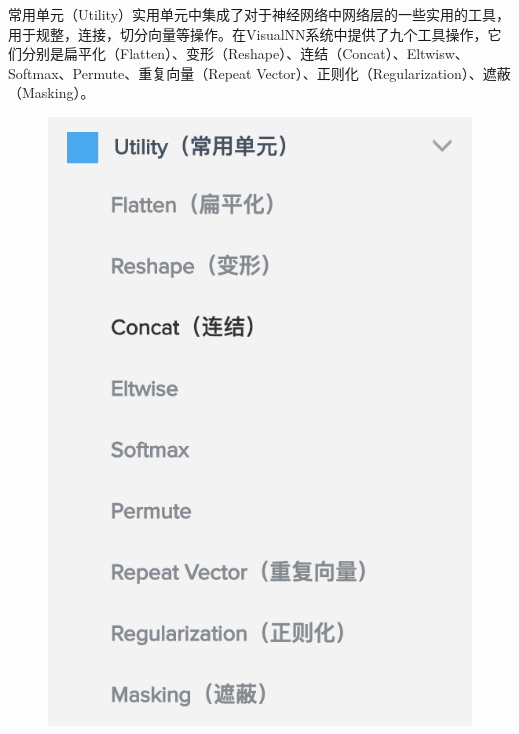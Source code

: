 \documentclass{progbookcn}
\begin{document}
常用单元（Utility）实用单元中集成了对于神经网络中网络层的一些实用的工具，用于规整，连接，切分向量等操作。在VisualNN系统中提供了九个工具操作，它们分别是扁平化（Flatten）、变形（Reshape）、连结（Concat）、Eltwisw、Softmax、Permute、重复向量（Repeat Vector）、正则化（Regularization）、遮蔽（Masking）。
\begin{figure}[H]
  \centering
  \includegraphics[scale = 0.6]{Utility_layer.png}
\end{figure}
\end{document}

